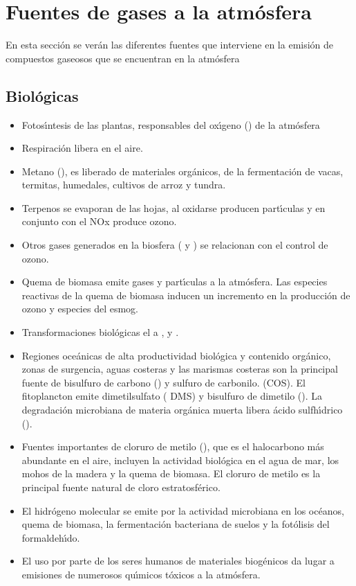 \section{Fuentes de gases a la atmósfera}
\label{fgatm}
En esta sección se verán las diferentes fuentes que interviene en la emisión de compuestos gaseosos que se encuentran en la atmósfera

\subsection{Biológicas}\label{subbio}
\begin{itemize}
\item Fotos\'{\i}ntesis de las plantas, responsables del ox\'{\i}geno () de la atmósfera
\item  Respiración libera  en el aire.
\item  Metano (), es liberado de materiales orgánicos, de la fermentación de vacas, termitas, humedales, cultivos de arroz y tundra.
\item  Terpenos  se evaporan de las hojas, al oxidarse producen part\'{\i}culas y en conjunto con el NOx produce ozono. 
\item Otros gases generados en la biosfera ( y ) se relacionan con el control de ozono.
\item Quema de biomasa emite gases y part\'{\i}culas a la atmósfera. Las especies reactivas de la quema de biomasa inducen un incremento en la producción de ozono y especies del esmog.
\item  Transformaciones biológicas el  a ,  y .
\item Regiones oceánicas de alta productividad biológica y contenido orgánico, zonas de surgencia, aguas costeras y las marismas costeras son la principal fuente de bisulfuro de carbono ()  y sulfuro de carbonilo. (COS). El fitoplancton emite dimetilsulfato ( DMS) y bisulfuro de dimetilo (). La degradación microbiana de materia orgánica muerta libera ácido sulfh\'{\i}drico ().
\item Fuentes importantes de cloruro de metilo (), que es el halocarbono más abundante en el aire, incluyen la actividad biológica en el agua de mar, los mohos de la madera y la quema de biomasa. El cloruro de metilo es la principal fuente natural de cloro estratosférico.
\item El hidrógeno molecular se emite por la actividad microbiana en los océanos, quema de biomasa, la fermentación bacteriana de suelos y la fotólisis del formaldeh\'{\i}do.
\item El uso por parte de los seres humanos de materiales biogénicos da lugar a emisiones de numerosos qu\'{\i}micos tóxicos a la atmósfera.
\end{itemize}
